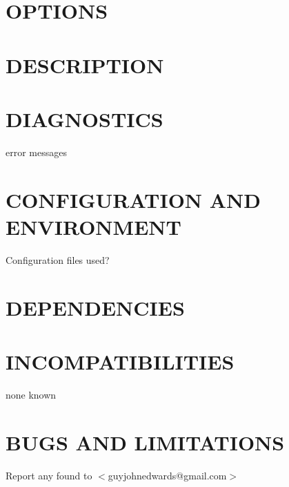 \documentclass{book}
\begin{document}
\section{OPTIONS}
\label{_OPTIONS}
\hypertarget{_OPTIONS}{}


\section{DESCRIPTION}
\label{_DESCRIPTION}
\hypertarget{_DESCRIPTION}{}


\section{DIAGNOSTICS}
\label{_DIAGNOSTICS}
\hypertarget{_DIAGNOSTICS}{}



error messages


\section{CONFIGURATION AND ENVIRONMENT}
\label{_CONFIGURATION_AND_ENVIRONMENT}
\hypertarget{_CONFIGURATION_AND_ENVIRONMENT}{}



Configuration files used?


\section{DEPENDENCIES}
\label{_DEPENDENCIES}
\hypertarget{_DEPENDENCIES}{}


\section{INCOMPATIBILITIES}
\label{_INCOMPATIBILITIES}
\hypertarget{_INCOMPATIBILITIES}{}



none known


\section{BUGS AND LIMITATIONS}
\label{_BUGS_AND_LIMITATIONS}
\hypertarget{_BUGS_AND_LIMITATIONS}{}



Report any found to $<$guyjohnedwards@gmail.com$>$
\end{document}
